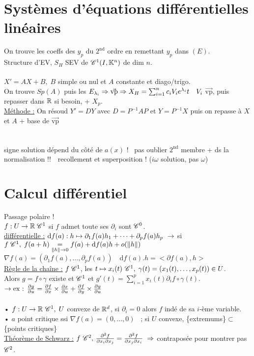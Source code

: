 \documentclass[12 pt]{book}
\begin{document}
\section*{Systèmes d'équations différentielles linéaires}
On trouve les coeffs des $y_p$ du $2^\text{nd}$ ordre en remettant $y_p$ dans $(E)$.\\
Structure d'EV, $S_H$ SEV de $\mathscr{C}^1(I,\mathbb{K}^n)$ de dim $n$.\\
\text{}\\
$X' =AX+B, \; B$ simple ou nul et $A$ constante et diago/trigo.\\
On trouve $Sp(A)$ puis les $E_{\lambda_i} \Rightarrow \Vec{\text{vp}} \Rightarrow X_H = \sum_{i=1}^n c_i V_i e^{\lambda_i}t \quad V_i$ $\Vec{\text{vp}}$, puis repasser dans $\mathbb{R}$ si besoin, + $X_p$.\\
\underline{Méthode :} On résoud $Y' = DY$ avec $D=P^{-1}AP$ et $Y=P^{-1}X$ puis on repasse à $X$ et $A$ + base de $\Vec{\text{vp}}$\\
\text{}\\
\text{}\\
signe solution dépend du côté de $a(x)$ ! \ pas oublier $2^\text{nd}$ membre + ds la normalisation !!\ \ recollement et superposition ! \qquad ($i\omega$ solution, pas $\omega$)\\

\section*{Calcul différentiel}
Passage polaire !\\
$f : U\to \mathbb{R} \; \mathscr{C}^1$ si $f$ admet toute ses $\partial_i$ sont $\mathscr{C}^0$.\\
\underline{différentielle :} $\text{d}f(a) : h\mapsto \partial_1f(a) h_1 +\dots + \partial_p f(a) h_p \ \rightarrow$ si $f \; \mathscr{C}^1, \; f(a+h) \underset{\|h\|\to0}{=} f(a)+\text{d}f(a) h +o(\|h\|)$\\
$\nabla f(a) = (\partial_1 f(a),\dots, \partial_p f(a)) \quad \text{d}f(a).h = <\partial f(a),h>$\\
\underline{Règle de la chaîne :} $f \; \mathscr{C}^1$, les $t\mapsto x_i(t)\ \mathscr{C}^1, \; \gamma(t) = (x_1(t),\dots,x_p(t))\in U$.\\
Alors $g=f\circ \gamma$ existe et $\mathscr{C}^1$ et $g'(t) = \sum_{i=1}^p x_i(t) \partial_if\circ \gamma(t)$.\\
$\rightarrow \text{ex : }\frac{\partial g}{\partial u} = \frac{\partial f}{\partial x}\times \frac{\partial x}{\partial u} + \frac{\partial f}{\partial y}\times \frac{\partial y}{\partial u}$\\
\text{}\\
• $f : U\to \mathbb{R} \ \mathscr{C}^1, \; U$ convexe de $\mathbb{R}^d$, si $\partial_i=0$ alors $f$ indé de sa $i$-ème variable.\\
• $a$ point critique ssi $\nabla f(a) =(0,\dots,0)$ \ ; si $U$ convexe, \{extremums\}$\subset$\{points critiques\}\\
\underline{Théorème de Schwarz :} $f \ \mathscr{C}^2, \, \frac{\partial^2 f}{\partial x_i \partial x_j} = \frac{\partial^2 f}{\partial x_j\partial x_i} \ \Rightarrow$ contraposée pour montrer pas $\mathscr{C}^2$.\\
\end{document}
